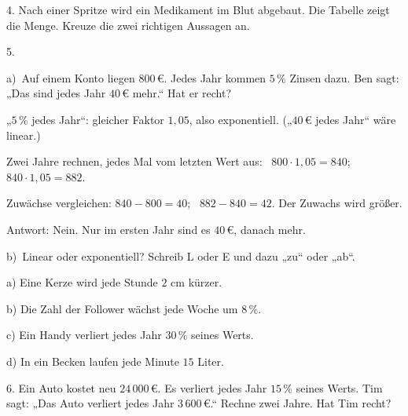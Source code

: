 \documentclass[11pt]{article}
\newcommand{\grau}[1]{{\color{mbgrau}#1}}
\begin{document}
\begin{pfaufg}{}{4.}{}
Nach einer Spritze wird ein Medikament im Blut abgebaut. Die Tabelle zeigt die Menge. Kreuze die zwei richtigen Aussagen an. 
\end{pfaufg}

\begin{pfaufg}{}{5.}{}
\grau{a)\ Auf einem Konto liegen $800\,€$. Jedes Jahr kommen $5\,\%$ Zinsen dazu. Ben sagt: „Das sind jedes Jahr $40\,€$ mehr.“ Hat er recht?\par\smallskip „$5\,\%$ jedes Jahr“: gleicher Faktor $1{,}05$, also exponentiell. („$40\,€$ jedes Jahr“ wäre linear.)\par Zwei Jahre rechnen, jedes Mal vom letzten Wert aus: \ $800 \cdot 1{,}05 = 840$; \ $840 \cdot 1{,}05 = 882$.\par Zuwächse vergleichen: $840 - 800 = 40$; \ $882 - 840 = 42$. Der Zuwachs wird größer.\par Antwort: Nein. Nur im ersten Jahr sind es $40\,€$, danach mehr.}
\par\medskip
b)\ Linear oder exponentiell? Schreib L oder E und dazu „zu“ oder „ab“. \par a) Eine Kerze wird jede Stunde $2$ cm kürzer. \par b) Die Zahl der Follower wächst jede Woche um $8\,\%$. \par c) Ein Handy verliert jedes Jahr $30\,\%$ seines Werts. \par d) In ein Becken laufen jede Minute $15$ Liter.
\end{pfaufg}

\begin{pfaufg}{}{6.}{}
Ein Auto kostet neu $24\,000\,€$. Es verliert jedes Jahr $15\,\%$ seines Werts. Tim sagt: „Das Auto verliert jedes Jahr $3\,600\,€$.“ Rechne zwei Jahre. Hat Tim recht?
\end{pfaufg}
\end{document}
